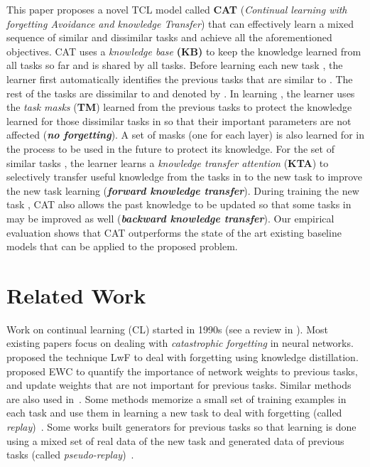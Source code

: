 \documentclass{article}
\begin{document}
This paper proposes a novel TCL model called \textbf{CAT} (\textit{Continual learning with forgetting Avoidance and knowledge Transfer}) that can effectively learn a mixed sequence of similar and dissimilar tasks and achieve all the aforementioned objectives. 
CAT uses a \textit{knowledge base} \textbf{(KB)} to keep the knowledge learned from all tasks so far and is shared by all tasks. Before learning each new task , the learner first automatically identifies the previous tasks  that are similar to . The rest of the tasks are dissimilar to  and denoted by . In learning , the learner uses the \textit{task masks} (\textbf{TM}) learned from the previous tasks to protect the knowledge learned for those dissimilar tasks in  so that their important parameters are not affected (\textbf{\textit{no forgetting}}). A set of masks (one for each layer) is also learned for  in the process to be used in the future to protect its knowledge. For the set of similar tasks , the learner learns a \textit{knowledge transfer attention} (\textbf{KTA}) to selectively transfer useful knowledge from the tasks in  to the new task to improve the new task learning (\textbf{\textit{forward knowledge transfer}}). 
During training the new task , CAT also allows the past knowledge to be updated so that some tasks in  may be improved as well (\textbf{\textit{backward knowledge transfer}}).
Our empirical evaluation shows that CAT outperforms the state of the art existing baseline models that can be applied to the proposed problem.


\section{Related Work}
\label{sec:related}

Work on continual learning (CL) started in 1990s (see a review in \citep{Li2016LwF}). Most existing papers focus on dealing with \textit{catastrophic forgetting} in neural networks. \cite{Li2016LwF} proposed the technique LwF to deal with forgetting using knowledge distillation. \cite{Kirkpatrick2017overcoming} proposed EWC to quantify the importance of network weights to previous tasks, and update weights that are not important for previous tasks. Similar methods are also used in~\citep{DBLP:conf/eccv/AljundiBERT18,schwarz2018progress,Zenke2017continual}. 
Some methods memorize a small set of training examples in each task and use them in learning a new task to deal with forgetting (called \textit{replay})~\citep{Rebuffi2017,Lopez2017gradient,Chaudhry2019ICLR,wu2018memory,Kemker2018fearnet}. 
Some works built generators for previous tasks so that learning is done using a mixed set of real data of the new task and generated data of previous tasks (called \textit{pseudo-replay})~\citep{Shin2017continual,Kamra2017deep,Rostami2019ijcai,hu2019overcoming}. 
\end{document}
